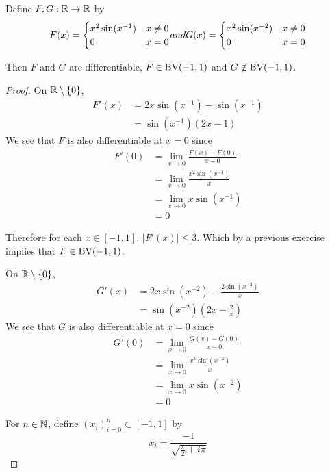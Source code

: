 \documentclass{book}
\begin{document}
	\begin{ex}  
		Define $F,G:\mathbb{R} \rightarrow \mathbb{R}$ by 
		\[ F(x) = \begin{cases}
			x^2 \sin(x^{-1}) & x \neq 0\\
			0 & x=0\\
		\end{cases}$$ and $$G(x)=
		\begin{cases}
			x^2 \sin(x^{-2}) & x \neq 0\\
			0 & x=0
		\end{cases}
		\]
		
		Then $F$ and $G$ are differentiable, $F \in \text{BV}(-1,1)$ and $G \not \in \text{BV}(-1,1)$.
	\end{ex}
	
	\begin{proof}
		On $\mathbb{R} \setminus \{0\}$, 
		\begin{align*}
			F'(x) 
			&= 2x \sin(x^{-1})- \sin(x^{-1})\\
			&= \sin(x^{-1})(2x-1)
		\end{align*} We see that $F$ is also differentiable at $x=0$ since 
		\begin{align*}
			F'(0) 
			&= \lim_{x \rightarrow 0} \frac{F(x)-F(0)}{x-0}\\
			&= \lim_{x \rightarrow 0} \frac{x^2 \sin(x^{-1})}{x}\\
			&= \lim_{x \rightarrow 0} x \sin(x^{-1})\\
			&=0
		\end{align*}
		
		Therefore for each $x \in [-1,1]$, $|F'(x)| \leq 3$. Which by a previous exercise implies that $F \in \text{BV}(-1,1)$.
		
		On $\mathbb{R} \setminus \{0\}$, 
		\begin{align*}
			G'(x)
			&= 2x \sin(x^{-2})-\frac{2 \sin(x^{-2})}{x}\\
			&= \sin(x^{-2})(2x-\frac{2}{x})
		\end{align*}
		We see that $G$ is also differentiable at $x=0$ since 
		\begin{align*}
			G'(0) 
			&= \lim_{x \rightarrow 0} \frac{G(x)-G(0)}{x-0}\\
			&= \lim_{x \rightarrow 0} \frac{x^2 \sin(x^{-2})}{x}\\
			&= \lim_{x \rightarrow 0} x \sin(x^{-2})\\
			&=0
		\end{align*}
		
		For $n \in \mathbb{N}$, define $(x_i)_{i=0}^n \subset [-1,1]$ by $$x_i= \frac{-1}{\sqrt{\frac{\pi}{2}+i\pi}}$$
		

\end{proof}
\end{document}

